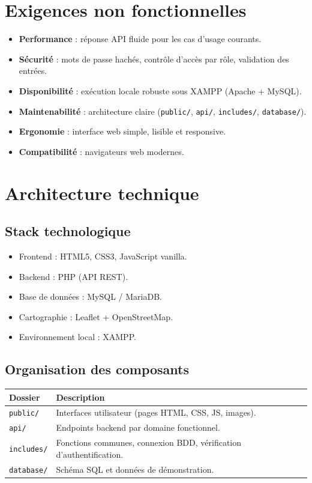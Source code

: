 \documentclass[12pt,a4paper]{article}
\begin{document}
\section{Exigences non fonctionnelles}
\begin{itemize}[leftmargin=1.2cm]
  \item \textbf{Performance} : réponse API fluide pour les cas d'usage courants.
  \item \textbf{Sécurité} : mots de passe hachés, contrôle d'accès par rôle, validation des entrées.
  \item \textbf{Disponibilité} : exécution locale robuste sous XAMPP (Apache + MySQL).
  \item \textbf{Maintenabilité} : architecture claire (\texttt{public/}, \texttt{api/}, \texttt{includes/}, \texttt{database/}).
  \item \textbf{Ergonomie} : interface web simple, lisible et responsive.
  \item \textbf{Compatibilité} : navigateurs web modernes.
\end{itemize}

\section{Architecture technique}
\subsection{Stack technologique}
\begin{itemize}[leftmargin=1.2cm]
  \item Frontend : HTML5, CSS3, JavaScript vanilla.
  \item Backend : PHP (API REST).
  \item Base de données : MySQL / MariaDB.
  \item Cartographie : Leaflet + OpenStreetMap.
  \item Environnement local : XAMPP.
\end{itemize}

\subsection{Organisation des composants}
\begin{longtable}{p{3.5cm}p{11cm}}
\toprule
\textbf{Dossier} & \textbf{Description} \\
\midrule
\texttt{public/} & Interfaces utilisateur (pages HTML, CSS, JS, images). \\
\texttt{api/} & Endpoints backend par domaine fonctionnel. \\
\texttt{includes/} & Fonctions communes, connexion BDD, vérification d'authentification. \\
\texttt{database/} & Schéma SQL et données de démonstration. \\
\bottomrule
\end{longtable}
\end{document}
